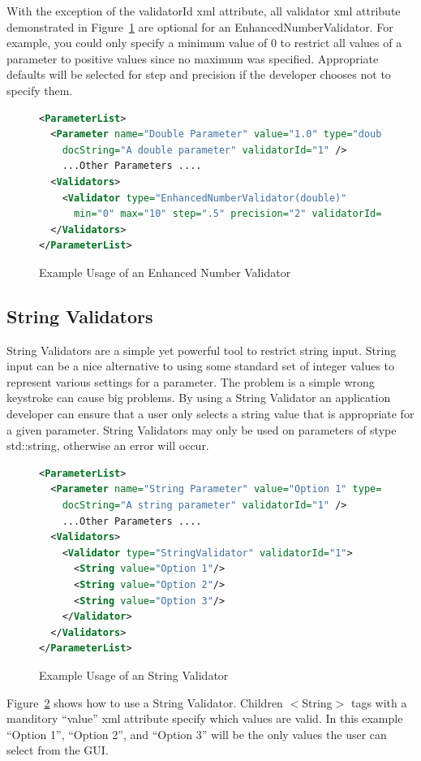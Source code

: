 With the exception of the validatorId xml attribute, all validator xml attribute demonstrated in Figure~\ref{EnhancedNumberValidatorXML}
are optional for an EnhancedNumberValidator. For example, you could only specify a minimum value of 0 to restrict all 
values of a parameter to positive values since no maximum was specified.
Appropriate defaults will be selected for step and precision if the developer chooses not to specify them.
\begin{figure}
\centering
\begin{lstlisting}[language=XML]
<ParameterList>
  <Parameter name="Double Parameter" value="1.0" type="double" 
    docString="A double parameter" validatorId="1" />
    ...Other Parameters ....
  <Validators>
    <Validator type="EnhancedNumberValidator(double)" 
      min="0" max="10" step=".5" precision="2" validatorId="1"/>
  </Validators>
</ParameterList>
\end{lstlisting}
\caption{Example Usage of an Enhanced Number Validator}
\label{EnhancedNumberValidatorXML}
\end{figure}

\subsection{String Validators}
String Validators are a simple yet powerful tool to restrict string input. String input can be a nice alternative to
using some standard set of integer values to represent various settings for a parameter. The problem is a simple wrong 
keystroke can cause big problems. By using a String Validator an application developer can ensure that a user 
only selects a string value that is appropriate for a given parameter. 
String Validators may only be used on parameters of stype std::string, otherwise an error will occur.
\begin{figure}
\centering
\begin{lstlisting}[language=XML]
<ParameterList>
  <Parameter name="String Parameter" value="Option 1" type="string" 
    docString="A string parameter" validatorId="1" />
    ...Other Parameters ....
  <Validators>
    <Validator type="StringValidator" validatorId="1">
      <String value="Option 1"/> 
      <String value="Option 2"/> 
      <String value="Option 3"/> 
    </Validator>
  </Validators>
</ParameterList>
\end{lstlisting}
\caption{Example Usage of an String Validator}
\label{StringValidatorXML}
\end{figure}
Figure~\ref{StringValidatorXML} shows how to use a String Validator. Children $<$String$>$ tags with a manditory ``value'' xml attribute specify which values are valid.
In this example ``Option 1'', ``Option 2'', and ``Option 3'' will be the only values the user can select from the GUI.

